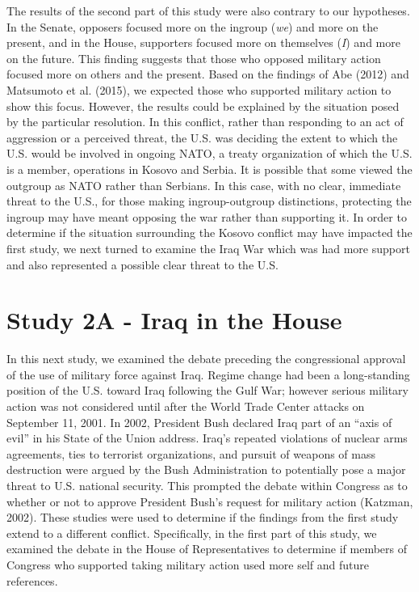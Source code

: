 \documentclass[english,man]{apa6}
\theoremstyle{definition}
\theoremstyle{definition}
\theoremstyle{definition}
\theoremstyle{remark}
\begin{document}
The results of the second part of this study were also contrary to our
hypotheses. In the Senate, opposers focused more on the ingroup
(\emph{we}) and more on the present, and in the House, supporters
focused more on themselves (\emph{I}) and more on the future. This
finding suggests that those who opposed military action focused more on
others and the present. Based on the findings of Abe (2012) and
Matsumoto et al. (2015), we expected those who supported military action
to show this focus. However, the results could be explained by the
situation posed by the particular resolution. In this conflict, rather
than responding to an act of aggression or a perceived threat, the U.S.
was deciding the extent to which the U.S. would be involved in ongoing
NATO, a treaty organization of which the U.S. is a member, operations in
Kosovo and Serbia. It is possible that some viewed the outgroup as NATO
rather than Serbians. In this case, with no clear, immediate threat to
the U.S., for those making ingroup-outgroup distinctions, protecting the
ingroup may have meant opposing the war rather than supporting it. In
order to determine if the situation surrounding the Kosovo conflict may
have impacted the first study, we next turned to examine the Iraq War
which was had more support and also represented a possible clear threat
to the U.S.

\section{Study 2A - Iraq in the
House}\label{study-2a---iraq-in-the-house}

In this next study, we examined the debate preceding the congressional
approval of the use of military force against Iraq. Regime change had
been a long-standing position of the U.S. toward Iraq following the Gulf
War; however serious military action was not considered until after the
World Trade Center attacks on September 11, 2001. In 2002, President
Bush declared Iraq part of an \enquote{axis of evil} in his State of the
Union address. Iraq's repeated violations of nuclear arms agreements,
ties to terrorist organizations, and pursuit of weapons of mass
destruction were argued by the Bush Administration to potentially pose a
major threat to U.S. national security. This prompted the debate within
Congress as to whether or not to approve President Bush's request for
military action (Katzman, 2002). These studies were used to determine if
the findings from the first study extend to a different conflict.
Specifically, in the first part of this study, we examined the debate in
the House of Representatives to determine if members of Congress who
supported taking military action used more self and future references.
\end{document}

